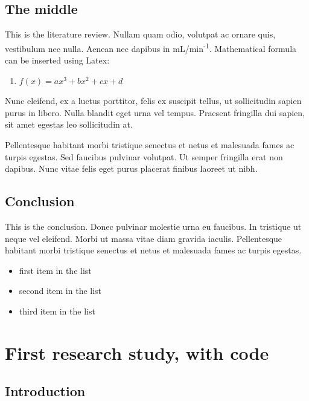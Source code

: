 \documentclass[12pt,a4paperpaper,]{report}
\providecommand{\tightlist}{%
  \setlength{\itemsep}{0pt}\setlength{\parskip}{0pt}}
\begin{document}
\section{The middle}\label{the-middle}

This is the literature review. Nullam quam odio, volutpat ac ornare
quis, vestibulum nec nulla. Aenean nec dapibus in
mL/min\textsuperscript{-1}. Mathematical formula can be inserted using
Latex:

\begin{enumerate}
\def\labelenumi{(\arabic{enumi})}
\tightlist
\item
  \(f(x) = ax^3 + bx^2 + cx + d\)
\end{enumerate}

Nunc eleifend, ex a luctus porttitor, felis ex suscipit tellus, ut
sollicitudin sapien purus in libero. Nulla blandit eget urna vel tempus.
Praesent fringilla dui sapien, sit amet egestas leo sollicitudin at.

Pellentesque habitant morbi tristique senectus et netus et malesuada
fames ac turpis egestas. Sed faucibus pulvinar volutpat. Ut semper
fringilla erat non dapibus. Nunc vitae felis eget purus placerat finibus
laoreet ut nibh.

\section{Conclusion}\label{conclusion}

This is the conclusion. Donec pulvinar molestie urna eu faucibus. In
tristique ut neque vel eleifend. Morbi ut massa vitae diam gravida
iaculis. Pellentesque habitant morbi tristique senectus et netus et
malesuada fames ac turpis egestas.

\begin{itemize}
\tightlist
\item
  first item in the list
\item
  second item in the list
\item
  third item in the list
\end{itemize}

\chapter{First research study, with
code}\label{first-research-study-with-code}

\section{Introduction}\label{introduction-2}
\end{document}
